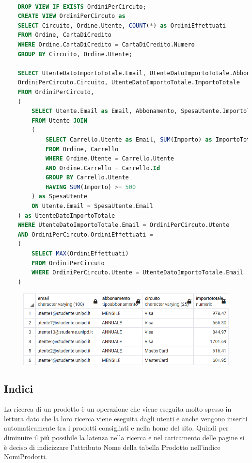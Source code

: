 \documentclass[10pt]{article}
\begin{document}
\begin{lstlisting}[language=SQL]

    DROP VIEW IF EXISTS OrdiniPerCircuto;
    CREATE VIEW OrdiniPerCircuto as
    SELECT Circuito, Ordine.Utente, COUNT(*) as OrdiniEffettuati
    FROM Ordine, CartaDiCredito
    WHERE Ordine.CartaDiCredito = CartaDiCredito.Numero
    GROUP BY Circuito, Ordine.Utente;
    
    SELECT UtenteDatoImportoTotale.Email, UtenteDatoImportoTotale.Abbonamento,
    OrdiniPerCircuto.Circuito, UtenteDatoImportoTotale.ImportoTotale
    FROM OrdiniPerCircuto,
    (
        SELECT Utente.Email as Email, Abbonamento, SpesaUtente.ImportoTotale
        FROM Utente JOIN
        (
            SELECT Carrello.Utente as Email, SUM(Importo) as ImportoTotale
            FROM Ordine, Carrello
            WHERE Ordine.Utente = Carrello.Utente
            AND Ordine.Carrello = Carrello.Id
            GROUP BY Carrello.Utente
            HAVING SUM(Importo) >= 500
        ) as SpesaUtente
        ON Utente.Email = SpesaUtente.Email
    ) as UtenteDatoImportoTotale
    WHERE UtenteDatoImportoTotale.Email = OrdiniPerCircuto.Utente
    AND OrdiniPerCircuto.OrdiniEffettuati = 
    (
        SELECT MAX(OrdiniEffettuati)
        FROM OrdiniPerCircuto
        WHERE OrdiniPerCircuto.Utente = UtenteDatoImportoTotale.Email
    )
\end{lstlisting}

\begin{center}
    \begin{figure}[H]
        \includegraphics[scale=1]{media/query5.png}
        \label{query5}
    \end{figure}
\end{center}

\subsection{Indici}

La ricerca di un prodotto è un operazione che viene eseguita molto spesso in lettura dato
che la loro ricerca viene eseguita dagli utenti e anche vengono inseriti automaticamente tra i prodotti consigliati
e nella home del sito. Quindi per diminuire il più possibile la latenza nella ricerca e nel caricamento delle pagine 
si è deciso di indicizzare l'attributo Nome della tabella Prodotto nell'indice NomiProdotti.
\end{document}
